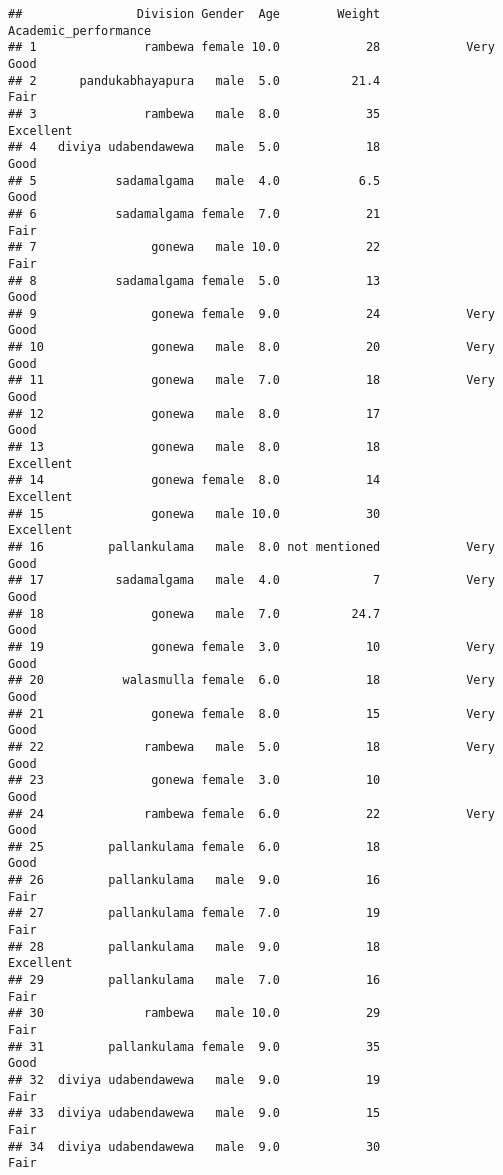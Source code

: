 \documentclass[
]{article}
\begin{document}
\begin{verbatim}
##                Division Gender  Age        Weight Academic_performance
## 1               rambewa female 10.0            28            Very Good
## 2      pandukabhayapura   male  5.0          21.4                 Fair
## 3               rambewa   male  8.0            35            Excellent
## 4   diviya udabendawewa   male  5.0            18                 Good
## 5           sadamalgama   male  4.0           6.5                 Good
## 6           sadamalgama female  7.0            21                 Fair
## 7                gonewa   male 10.0            22                 Fair
## 8           sadamalgama female  5.0            13                 Good
## 9                gonewa female  9.0            24            Very Good
## 10               gonewa   male  8.0            20            Very Good
## 11               gonewa   male  7.0            18            Very Good
## 12               gonewa   male  8.0            17                 Good
## 13               gonewa   male  8.0            18            Excellent
## 14               gonewa female  8.0            14            Excellent
## 15               gonewa   male 10.0            30            Excellent
## 16         pallankulama   male  8.0 not mentioned            Very Good
## 17          sadamalgama   male  4.0             7            Very Good
## 18               gonewa   male  7.0          24.7                 Good
## 19               gonewa female  3.0            10            Very Good
## 20           walasmulla female  6.0            18            Very Good
## 21               gonewa female  8.0            15            Very Good
## 22              rambewa   male  5.0            18            Very Good
## 23               gonewa female  3.0            10                 Good
## 24              rambewa female  6.0            22            Very Good
## 25         pallankulama female  6.0            18                 Good
## 26         pallankulama   male  9.0            16                 Fair
## 27         pallankulama female  7.0            19                 Fair
## 28         pallankulama   male  9.0            18            Excellent
## 29         pallankulama   male  7.0            16                 Fair
## 30              rambewa   male 10.0            29                 Fair
## 31         pallankulama female  9.0            35                 Good
## 32  diviya udabendawewa   male  9.0            19                 Fair
## 33  diviya udabendawewa   male  9.0            15                 Fair
## 34  diviya udabendawewa   male  9.0            30                 Fair

\end{verbatim}
\end{document}
